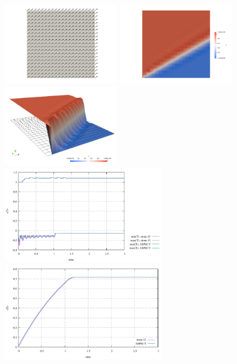 \begin{center}
\includegraphics[width=5cm]{python_codes/fieldstone_43/results/experiment4/vel}
\includegraphics[width=5cm]{python_codes/fieldstone_43/results/experiment4/Tss}
\includegraphics[width=5cm]{python_codes/fieldstone_43/results/experiment4/Tss3D}\\
\includegraphics[width=7cm]{python_codes/fieldstone_43/results/experiment4/stats_T}
\includegraphics[width=7cm]{python_codes/fieldstone_43/results/experiment4/avrg_T}
\end{center}

